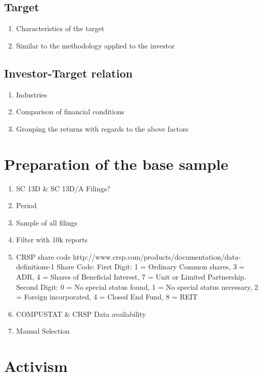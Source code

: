 \documentclass{article}
\begin{document}
  \subsection{Target}

    \begin{enumerate}

      \item Characteristics of the target 
      \item Similar to the methodology applied to the investor
    \end{enumerate}

  \subsection{Investor-Target relation}

    \begin{enumerate}
      \item Industries
      \item Comparison of financial conditions 
      \item Grouping the returns with regards to the above factors
    \end{enumerate}

\section{Preparation of the base sample}

  \begin{enumerate}
    \item SC 13D \& SC 13D/A Filings? 
    \item Period
    \item Sample of all filings
    \item Filter with 10k reports 
    \item CRSP share code http://www.crsp.com/products/documentation/data-definitions-1
    Share Code: First Digit: 1 = Ordinary Common shares, 3 = ADR, 4 = Shares of Beneficial Interest, 7 = Unit or Limited Partnership. Second Digit: 0 = No special status found, 1 = No special status necessary, 2 = Foreign incorporated, 4 = Closed End Fund, 8 = REIT	
    \item COMPUSTAT \& CRSP Data availability
    \item Manual Selection
  \end{enumerate}

\section{Activism}
\end{document}
